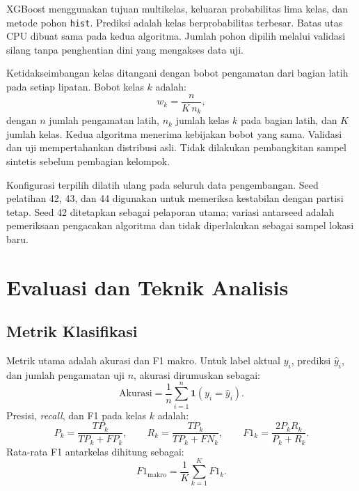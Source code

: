 XGBoost menggunakan tujuan multikelas, keluaran probabilitas lima kelas, dan metode pohon \texttt{hist}. Prediksi adalah kelas berprobabilitas terbesar. Batas utas CPU dibuat sama pada kedua algoritma. Jumlah pohon dipilih melalui validasi silang tanpa penghentian dini yang mengakses data uji.

Ketidakseimbangan kelas ditangani dengan bobot pengamatan dari bagian latih pada setiap lipatan. Bobot kelas $k$ adalah:
\begin{equation}
    w_k=\frac{n}{K\,n_k},
    \label{eq:bab3-bobot}
\end{equation}
dengan $n$ jumlah pengamatan latih, $n_k$ jumlah kelas $k$ pada bagian latih, dan $K$ jumlah kelas. Kedua algoritma menerima kebijakan bobot yang sama. Validasi dan uji mempertahankan distribusi asli. Tidak dilakukan pembangkitan sampel sintetis sebelum pembagian kelompok.

Konfigurasi terpilih dilatih ulang pada seluruh data pengembangan. Seed pelatihan 42, 43, dan 44 digunakan untuk memeriksa kestabilan dengan partisi tetap. Seed 42 ditetapkan sebagai pelaporan utama; variasi antarseed adalah pemeriksaan pengacakan algoritma dan tidak diperlakukan sebagai sampel lokasi baru.

\section{Evaluasi dan Teknik Analisis}

\subsection{Metrik Klasifikasi}

Metrik utama adalah akurasi dan F1 makro. Untuk label aktual $y_i$, prediksi $\hat{y}_i$, dan jumlah pengamatan uji $n$, akurasi dirumuskan sebagai:
\begin{equation}
    \mathrm{Akurasi}=\frac{1}{n}\sum_{i=1}^{n}\mathbf{1}(y_i=\hat{y}_i).
    \label{eq:bab3-akurasi}
\end{equation}
Presisi, \textit{recall}, dan F1 pada kelas $k$ adalah:
\begin{equation}
    P_k=\frac{TP_k}{TP_k+FP_k},\qquad
    R_k=\frac{TP_k}{TP_k+FN_k},\qquad
    F1_k=\frac{2P_kR_k}{P_k+R_k}.
    \label{eq:bab3-metrik-kelas}
\end{equation}
Rata-rata F1 antarkelas dihitung sebagai:
\begin{equation}
    F1_{\mathrm{makro}}=\frac{1}{K}\sum_{k=1}^{K}F1_k.
    \label{eq:bab3-f1-makro}
\end{equation}

